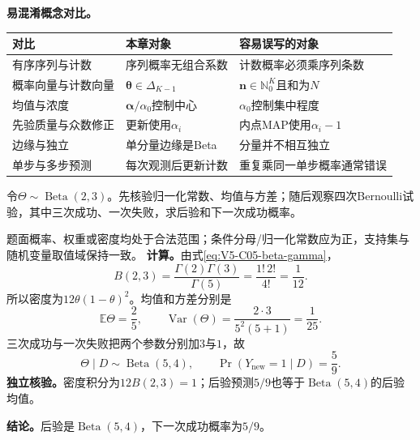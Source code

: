 \begin{samepage}
\label{struct:V5-C05-CH31}
\textbf{易混淆概念对比。}
\begin{center}
\small
\begin{tabularx}{\linewidth}{@{}l X X@{}}
\toprule 对比 & 本章对象 & 容易误写的对象\\ \midrule
有序序列与计数 & 序列概率无组合系数 & 计数概率必须乘序列条数\\
概率向量与计数向量 & $\boldsymbol\theta\in\Delta_{K-1}$ & $\boldsymbol n\in\mathbb N_0^K$且和为$N$\\
均值与浓度 & $\boldsymbol\alpha/\alpha_0$控制中心 & $\alpha_0$控制集中程度\\
先验质量与众数修正 & 更新使用$\alpha_i$ & 内点MAP使用$\alpha_i-1$\\
边缘与独立 & 单分量边缘是Beta & 分量并不相互独立\\
单步与多步预测 & 每次观测后更新计数 & 重复乘同一单步概率通常错误\\
\bottomrule
\end{tabularx}
\end{center}
\end{samepage}

\label{struct:V5-C05-CH32}
\begin{example}[Beta特例与Bernoulli更新]\label{exm:V5-C05-beta-update}
令$\Theta\sim\operatorname{Beta}(2,3)$。先核验归一化常数、均值与方差；随后观察四次Bernoulli试验，其中三次成功、一次失败，求后验和下一次成功概率。
\end{example}
\begin{solution}
\SolGiven 题面概率、权重或密度均处于合法范围；条件分母/归一化常数应为正，支持集与随机变量取值域保持一致。
\SolDerive
\nopagebreak[4]
\textbf{计算。}由式\eqref{eq:V5-C05-beta-gamma}，
\[
B(2,3)=\frac{\Gamma(2)\Gamma(3)}{\Gamma(5)}
=\frac{1!\,2!}{4!}=\frac1{12}.
\]
所以密度为$12\theta(1-\theta)^2$。均值和方差分别是
\[
\mathbb E\Theta=\frac25,\qquad
\operatorname{Var}(\Theta)=\frac{2\cdot3}{5^2(5+1)}=\frac1{25}.
\]
三次成功与一次失败把两个参数分别加$3$与$1$，故
\[
\Theta\mid D\sim\operatorname{Beta}(5,4),
\qquad
\Pr(Y_{\mathrm{new}}=1\mid D)=\frac59.
\]
\textbf{独立核验。}密度积分为$12B(2,3)=1$；后验预测$5/9$也等于$\operatorname{Beta}(5,4)$的后验均值。

\textbf{结论。}后验是$\operatorname{Beta}(5,4)$，下一次成功概率为$5/9$。
\end{solution}

